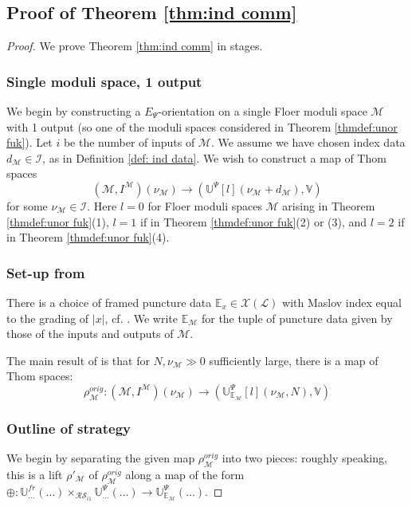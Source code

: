 \documentclass{TPmod}
\def\bE{\mathbb{E}}
\def\bU{\mathbb{U}}
\def\bV{\mathbb{V}}
\newcommand{\cI}{\mathcal{I}}
\newcommand{\cL}{\mathcal{L}}
\newcommand{\cM}{\mathcal{M}}
\newcommand{\cR}{\mathcal{R}}
\newcommand{\cS}{\mathcal{S}}
\newcommand{\cX}{\mathcal{X}}
\numberwithin{equation}{section}
\begin{document}
\subsection{Proof of Theorem \ref{thm:ind comm}}\label{sec: proo ind comm}
    \begin{proof}
        
        We prove Theorem \ref{thm:ind comm} in stages. 

        
        
        \subsubsection*{Single moduli space, 1 output}

        We begin by constructing a $E_\Psi$-orientation on a single Floer moduli space $\cM$ with 1 output (so one of the moduli spaces considered in Theorem \ref{thmdef:unor fuk}).
        Let $i$ be the number of inputs of $\cM$. We assume we have chosen index data $d_\cM \in \cI$, as in Definition \ref{def: ind data}. We wish to construct a map of Thom spaces 
        \begin{equation} \label{eq: goal ind comm}
            (\cM, I^\cM)(\nu_\cM) \to (\bU^\Psi[l](\nu_\cM + d_\cM), \bV)
        \end{equation}
        for some $\nu_\cM \in \cI$. Here $l=0$ for Floer moduli spaces $\cM$ arising in Theorem \ref{thmdef:unor fuk}(1), $l=1$ if in Theorem \ref{thmdef:unor fuk}(2) or (3), and $l=2$ if in Theorem \ref{thmdef:unor fuk}(4).

    \subsubsection*{Set-up from \cite{PS2}}

        There is a choice of framed puncture data $\bE_x \in \cX(\cL)$ with Maslov index equal to the grading of $|x|$, cf. \cite[Section 6]{PS2}. We write $\bE_\cM$ for the tuple of puncture data given by those of the inputs and outputs of $\cM$.
        
        The main result of \cite[Section 6]{PS2} is that for $N, \nu_\cM \gg 0$ sufficiently large, there is a map of Thom spaces:
        \begin{equation}\label{eq: PS2 reca}
            \rho^{orig}_\cM: (\cM, I^\cM)(\nu_\cM) \to (\bU^\Psi_{\bE_\cM}[l](\nu_\cM, N), \bV)
        \end{equation}
    \subsubsection*{Outline of strategy}
        We begin by separating the given map $\rho^{orig}_\cM$ into two pieces: roughly speaking, this is a lift $\rho'_\cM$ of $\rho^{orig}_\cM$ along a map of the form $\oplus: \bU^{fr}_{\ldots}(\ldots) \times_{\cR\cS_{i1}} \bU^{\Psi}_{\ldots}(\ldots) \to \bU^\Psi_{\bE_\cM}(\ldots)$.


\end{proof}
\end{document}

